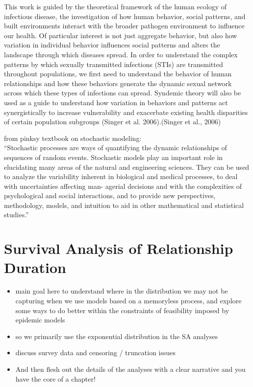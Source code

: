 \documentclass [11pt, proquest] {uwthesis}[2015/03/03]
\providecommand{\tightlist}{%
  \setlength{\itemsep}{0pt}\setlength{\parskip}{0pt}}
\begin{document}
This work is guided by the theoretical framework of the human ecology of
infectious disease, the investigation of how human behavior, social
patterns, and built environments interact with the broader pathogen
environment to influence our health. Of particular interest is not just
aggregate behavior, but also how variation in individual behavior
influences social patterns and alters the landscape through which
diseases spread. In order to understand the complex patterns by which
sexually transmitted infections (STIs) are transmitted throughout
populations, we first need to understand the behavior of human
relationships and how these behaviors generate the dynamic sexual
network across which these types of infections can spread. Syndemic
theory will also be used as a guide to understand how variation in
behaviors and patterns act synergistically to increase vulnerability and
exacerbate existing health disparities of certain population subgroups
(Singer et al. 2006).(Singer et al., 2006)

from pinksy textbook on stochastic modeling:\\
``Stochastic processes are ways of quantifying the dynamic relationships
of sequences of random events. Stochastic models play an important role
in elucidating many areas of the natural and engineering sciences. They
can be used to analyze the variability inherent in biological and
medical processes, to deal with uncertainties affecting man- agerial
decisions and with the complexities of psychological and social
interactions, and to provide new perspectives, methodology, models, and
intuition to aid in other mathematical and statistical studies.''

\chapter{Survival Analysis of Relationship Duration}\label{surv}
\begin{itemize}
\tightlist
\item
  main goal here to understand where in the distribution we may not be
  capturing when we use models based on a memoryless process, and
  explore some ways to do better within the constraints of feasibility
  imposed by epidemic models
\item
  so we primarily use the exponential distribution in the SA analyses
\item
  discuss survey data and censoring / truncation issues
\item
  And then flesh out the details of the analyses with a clear narrative
  and you have the core of a chapter!
\end{itemize}
\end{document}
